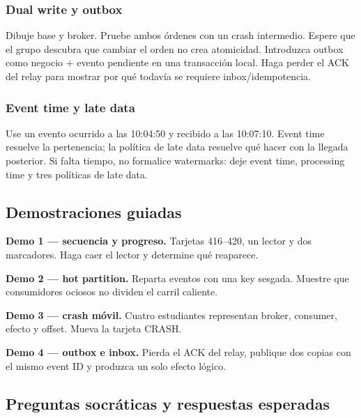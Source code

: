 \documentclass[variant=docente,cover=institutional,mode=screen]{ua-engineering-v6-article}
\begin{document}
\subsubsection{Dual write y outbox}
Dibuje base y broker. Pruebe ambos órdenes con un crash intermedio. Espere que el grupo descubra que cambiar el orden no crea atomicidad. Introduzca outbox como negocio + evento pendiente en una transacción local. Haga perder el ACK del relay para mostrar por qué todavía se requiere inbox/idempotencia.

\subsubsection{Event time y late data}
Use un evento ocurrido a las 10:04:50 y recibido a las 10:07:10. Event time resuelve la pertenencia; la política de late data resuelve qué hacer con la llegada posterior. Si falta tiempo, no formalice watermarks: deje event time, processing time y tres políticas de late data.

\subsection{Demostraciones guiadas}

\begin{uainfo}
\textbf{Demo 1 --- secuencia y progreso.} Tarjetas 416--420, un lector y dos marcadores. Haga caer el lector y determine qué reaparece.
\end{uainfo}
\begin{uainfo}
\textbf{Demo 2 --- hot partition.} Reparta eventos con una key sesgada. Muestre que consumidores ociosos no dividen el carril caliente.
\end{uainfo}
\begin{uainfo}
\textbf{Demo 3 --- crash móvil.} Cuatro estudiantes representan broker, consumer, efecto y offset. Mueva la tarjeta CRASH.
\end{uainfo}
\begin{uainfo}
\textbf{Demo 4 --- outbox e inbox.} Pierda el ACK del relay, publique dos copias con el mismo event ID y produzca un solo efecto lógico.
\end{uainfo}

\subsection{Preguntas socráticas y respuestas esperadas}
\end{document}
